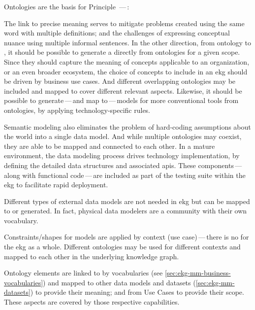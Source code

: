 %
%
Ontologies are the basis for Principle \,---\,:


The link to precise meaning serves to mitigate problems created using the same word with multiple definitions;
and the challenges of expressing conceptual nuance using multiple informal sentences.
In the other direction, from ontology to , it should be possible to generate a
 directly from ontologies for a given scope.
Since they should capture the meaning of concepts applicable to an organization, or an even broader ecosystem,
the choice of concepts to include in an \gls{ekg} should be driven by business use cases.
And different overlapping ontologies may be included and mapped to cover different relevant aspects.
Likewise, it should be possible to generate\,---\,and map to\,---\,models for more conventional tools from ontologies,
by applying technology-specific rules.

Semantic modeling also eliminates the problem of hard-coding assumptions about the world into a single data model.
And while multiple ontologies may coexist, they are able to be mapped and connected to each other.
In a mature environment, the data modeling process drives technology implementation,
by defining the detailed data structures and associated \glspl{api}.
These components\,---\,along with functional code\,---\,are included as part of the testing suite
within the \gls{ekg} to facilitate rapid deployment.

Different types of external data models are not needed in \gls{ekg} but can be mapped to or generated.
In fact, physical data modelers are a community with their own vocabulary.

Constraints/shapes for models are applied by context (use case)\,---\,there is no 
for the \gls{ekg} as a whole.
Different ontologies may be used for different contexts and mapped to each other in the underlying knowledge graph.

Ontology elements are linked to by vocabularies (see \ref{sec:ekg-mm-business-vocabularies}) and mapped to other
data models and datasets (\ref{sec:ekg-mm-datasets}) to provide their meaning;
and from Use Cases to provide their scope.
These aspects are covered by those respective capabilities.

